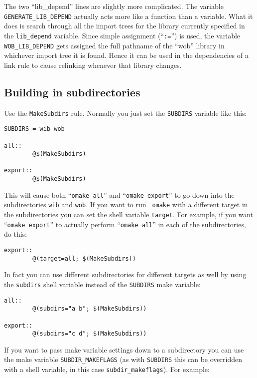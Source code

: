 \documentclass[11pt,twoside,onecolumn]{article}
\begin{document}
The two ``lib\_depend'' lines are slightly more complicated.  The variable
\verb|GENERATE_LIB_DEPEND| actually acts more like a function than a
variable. What it does is search through all the import trees for the library
currently specified in the \verb|lib_depend| variable.  Since simple assignment
(``{\tt :=}'') is used, the variable \verb|WOB_LIB_DEPEND| gets assigned the
full pathname of the ``wob'' library in whichever import tree it is found.
Hence it can be used in the dependencies of a link rule to cause relinking
whenever that library changes.

\subsection{Building in subdirectories}

Use the {\tt MakeSubdirs} rule.  Normally you just set the {\tt SUBDIRS}
variable like this:

{\small \begin{verbatim}
SUBDIRS = wib wob

all::
        @$(MakeSubdirs)

export::
        @$(MakeSubdirs)
\end{verbatim}}

This will cause both ``{\tt omake all}'' and ``{\tt omake export}'' to go down
into the subdirectories {\tt wib} and {\tt wob}.  If you want to run {\tt
omake} with a different target in the subdirectories you can set the shell
variable {\tt target}.  For example, if you want ``{\tt omake export}'' to
actually perform ``{\tt omake all}'' in each of the subdirectories, do this:

{\small \begin{verbatim}
export::
        @(target=all; $(MakeSubdirs))
\end{verbatim}}

In fact you can use different subdirectories for different targets as well by
using the {\tt subdirs} shell variable instead of the {\tt SUBDIRS} make
variable:

{\small \begin{verbatim}
all::
        @(subdirs="a b"; $(MakeSubdirs))

export::
        @(subdirs="c d"; $(MakeSubdirs))
\end{verbatim}}

If you want to pass make variable settings down to a subdirectory you can use
the make variable \verb|SUBDIR_MAKEFLAGS| (as with {\tt SUBDIRS} this can be
overridden with a shell variable, in this case \verb|subdir_makeflags|).  For
example:
\end{document}

